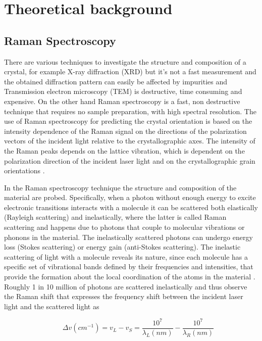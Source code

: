 \documentclass[openany,11pt,a4paper]{report}
\begin{document}
\chapter{Theoretical background}

\section{Raman Spectroscopy}
There are various techniques to investigate the structure and composition of a crystal, for example X-ray diffraction (XRD) but it's not a fast measurement and the obtained diffraction pattern can easily be affected by impurities and Transmission electron microscopy (TEM) is destructive, time consuming and expensive. On the other hand Raman spectroscopy is a fast, non destructive technique that requires no sample preparation, with high spectral resolution. The use of Raman spectroscopy for predicting the crystal orientation is based on the intensity dependence of the Raman signal on the directions of the polarization vectors of the incident light relative to the crystallographic axes. The intensity of the Raman peaks depends on the lattice vibration, which is dependent on the polarization direction of the incident laser light and on the crystallographic grain orientations \cite{sos}. 


In the Raman
spectroscopy technique the structure and composition of the material are
probed. Specifically, when a photon
without enough energy to excite electronic transitions interacts with a molecule it can be scattered both elastically (Rayleigh scattering) and inelastically, where the latter is called Raman scattering and happens due to photons that couple to molecular vibrations or phonons in the
material. The inelastically  scattered photons can undergo energy loss (Stokes
scattering) or energy gain (anti-­Stokes
scattering).
The inelastic scattering of light with a molecule reveals its nature, since  each molecule has a specific set of vibrational bands defined by their
frequencies and intensities, that provide the formation about the local coordination of the atoms in the material \cite{1}. Roughly 1 in 10 million of photons are scattered inelastically and thus observe the Raman shift that expresses the frequency shift between the
incident laser light and the scattered light as


\begin{equation}
\qquad \Delta v\left(c m^{-1}\right)=v_{L}-v_{S}=\frac{10^{7}}{\lambda_{L}(n m)}-\frac{10^{7}}{\lambda_{R}(n m)}
\end{equation}
\end{document}
